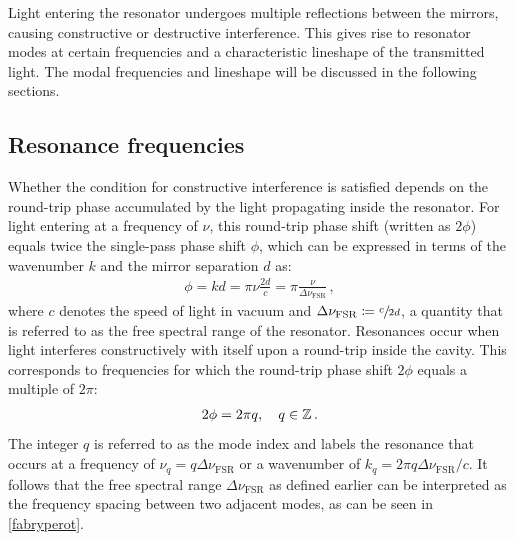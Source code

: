\documentclass[../Thesis-IJspeert.tex]{subfiles}
\begin{document}
Light entering the resonator undergoes multiple reflections between the mirrors, causing constructive or destructive interference. This gives rise to resonator modes at certain frequencies and a characteristic lineshape of the transmitted light. The modal frequencies and lineshape will be discussed in the following sections.

\subsection{Resonance frequencies}
Whether the condition for constructive interference is satisfied depends on the round-trip phase accumulated by the light propagating inside the resonator. For light entering at a frequency of $\nu$, this round-trip phase shift (written as $2\phi$) equals twice the single-pass phase shift $\phi$, which can be expressed in terms of the wavenumber $k$ and the mirror separation $d$ as:
\begin{align}
	\label{phiairy}
	\phi=kd=\pi\nu\frac{2d}{c}=\pi\frac{\nu}{\Delta\nu_\mathrm{FSR}}\,,
\end{align}
where $c$ denotes the speed of light in vacuum and $\Delta\nu_\mathrm{FSR}\coloneqq\sfrac{c}{2d}$, a quantity that is referred to as the free spectral range of the resonator. Resonances occur when light interferes constructively with itself upon a round-trip inside the cavity. This corresponds to frequencies for which the round-trip phase shift $2\phi$ equals a multiple of $2\pi$:
\begin{align}
	\label{rescondition}
	2\phi=2\pi q,\quad q \in \mathbb{Z}\,.
\end{align}
The integer $q$ is referred to as the mode index and labels the resonance that occurs at a frequency of $\nu_q=q\Delta\nu_\mathrm{FSR}$ or a wavenumber of $k_q=2\pi q \Delta\nu_\mathrm{FSR}/c$. It follows that the free spectral range $\Delta\nu_\mathrm{FSR}$ as defined earlier can be interpreted as the frequency spacing between two adjacent modes, as can be seen in \autoref{fabryperot}.
\end{document}
